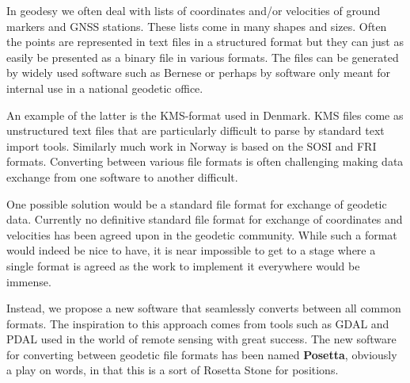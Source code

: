 In geodesy we often deal with lists of coordinates and/or velocities of ground
markers and GNSS stations. These lists come in many shapes and sizes. Often the
points are represented in text files in a structured format but they can just as
easily be presented as a binary file in various formats. The files can be
generated by widely used software such as Bernese or perhaps by software only
meant for internal use in a national geodetic office.

An example of the latter is the KMS-format used in Denmark. KMS files come as
unstructured text files that are particularly difficult to parse by standard
text import tools. Similarly much work in Norway is based on the SOSI and FRI
formats. Converting between various file formats is often challenging making
data exchange from one software to another difficult.

One possible solution would be a standard file format for exchange of geodetic
data. Currently no definitive standard file format for exchange of coordinates
and velocities has been agreed upon in the geodetic community. While such a
format would indeed be nice to have, it is near impossible to get to a stage
where a single format is agreed as the work to implement it everywhere would be
immense.

Instead, we propose a new software that seamlessly converts between all common
formats. The inspiration to this approach comes from tools such as GDAL and
PDAL used in the world of remote sensing with great success. The new software
for converting between geodetic file formats has been named \textbf{Posetta},
obviously a play on words, in that this is a sort of Rosetta Stone for
positions.


\endinput

